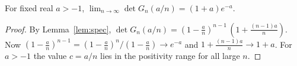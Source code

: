 \begin{theorem}\label{thm:main}
For fixed real $a>-1$, $\displaystyle\lim_{n\to\infty}\det G_n(a/n)=(1+a)e^{-a}$.
\end{theorem}
\begin{proof}
By Lemma~\ref{lem:spec}, $\det G_n(a/n)=(1-\frac an)^{n-1}\,(1+\frac{(n-1)a}{n})$.
Now $(1-\frac an)^{n-1}=(1-\frac an)^n/(1-\frac an)\to e^{-a}$ and $1+\frac{(n-1)a}{n}\to1+a$.
For $a>-1$ the value $c=a/n$ lies in the positivity range for all large $n$.
\end{proof}
